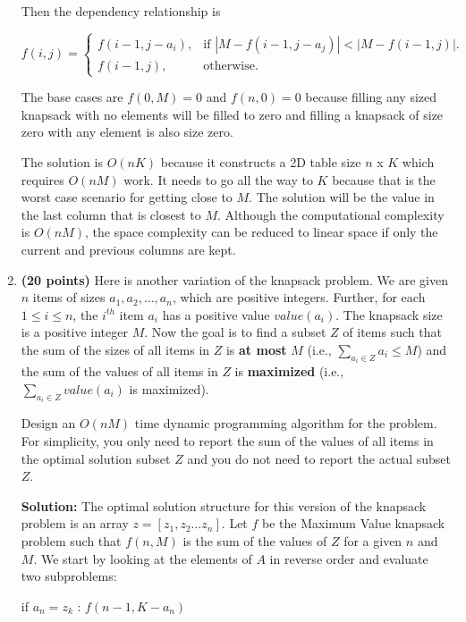 \documentclass[11pt]{article}
\begin{document}
\begin{enumerate}
Then the dependency relationship is

\begin{equation}
  f(i, j)=\begin{cases}
    f(i-1, j-a_i), & \text{if $\left|M-f(i-1, j-a_j)\right| < \left| M-f(i-1, j)\right|$}.\\
    f(i-1, j), & \text{otherwise}.
  \end{cases}
\end{equation}

The base cases are $f(0, M) = 0$ and $f(n, 0) = 0$ because filling any sized knapsack with no elements will be filled to zero and filling a knapsack of size zero with any element is also size zero.

The solution is $O(nK)$ because it constructs a 2D table size $n$ x $K$ which requires $O(nM)$ work. It needs to go all the way to $K$ because that is the worst case scenario for getting close to $M$. The solution will be the value in the last column that is closest to $M$. Although the computational complexity is $O(nM)$, the space complexity can be reduced to linear space if only the current and previous columns are kept.

\item
 {\bf (20 points)}
Here is another variation of the knapsack problem. We are given $n$ items of sizes
$a_1,a_2,\ldots,a_n$, which are positive integers. Further, for each $1\leq i\leq n$, the $i^{th}$ item $a_i$ has a positive value $value(a_i)$. The knapsack size is a positive integer $M$.
Now the goal is to find a subset $Z$ of items such that the
sum of the sizes of all items in $Z$ is {\bf at most} $M$ (i.e., $\sum_{a_i\in Z}a_i\leq M$) and the
sum of the values of all items in $Z$ is {\bf maximized} (i.e., $\sum_{a_i\in Z}value(a_i)$ is maximized).

Design an $O(nM)$ time dynamic programming algorithm for the problem. For simplicity, you only need to report the sum of the values of all items in the optimal solution subset $Z$ and you do not need to report the
actual subset $Z$.

{\bf Solution:} The optimal solution structure for this version of the knapsack problem is an array $z=\left[ z_1, z_2\ldots z_n\right]$. Let $f$ be the Maximum Value knapsack problem such that $f(n, M)$ is the sum of the values of $Z$ for a given $n$ and $M$. We start by looking at the elements of $A$ in reverse order and evaluate two subproblems:

if $a_n = z_k$ : \hfill $f(n-1, K-a_n)$


\end{enumerate}
\end{document}
